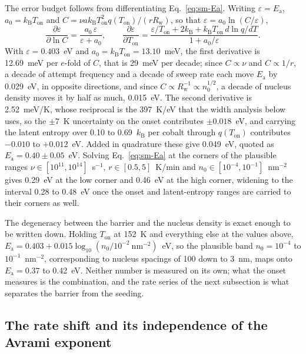 \documentclass[reprint,twocolumn,prb,amsmath,amssymb,superscriptaddress,floatfix]{revtex4-2}
\newcommand{\kB}{k_{\mathrm{B}}}
\newcommand{\Ea}{E_{\mathrm{a}}}
\newcommand{\Ton}{T_{\mathrm{on}}}
\begin{document}
The error budget follows from differentiating Eq.~\eqref{eq:sm-Ea}. Writing
$\varepsilon=\Ea$, $a_{0}=\kB\Ton$ and $C=\nu a\kB\Ton^{2}q(\Ton)/(r R_{\mathrm{w}})$, so that
$\varepsilon=a_{0}\ln(C/\varepsilon)$,
\begin{equation}
  \frac{\partial\varepsilon}{\partial\ln C}=\frac{a_{0}\,\varepsilon}{\varepsilon+a_{0}},
  \qquad
  \frac{\partial\varepsilon}{\partial\Ton}
  =\frac{\varepsilon/\Ton+2\kB+\kB\Ton\,d\ln q/dT}{1+a_{0}/\varepsilon}.
  \label{eq:sm-sensitivity}
\end{equation}
With $\varepsilon=0.403$~eV and $a_{0}=\kB\Ton=13.10$~meV, the first derivative is 12.69~meV
per $e$-fold of $C$, that is 29~meV per decade; since $C\propto\nu$ and $C\propto1/r$, a decade
of attempt frequency and a decade of sweep rate each move $\Ea$ by 0.029~eV, in opposite
directions, and since $C\propto R_{\mathrm{w}}^{-1}\propto n_{0}^{1/2}$, a decade of nucleus
density moves it by half as much, 0.015~eV. The second derivative is 2.52~meV/K, whose
reciprocal is the 397~K/eV that the width analysis below uses, so the $\pm7$~K uncertainty on
the onset contributes $\pm0.018$~eV, and carrying the latent entropy over 0.10 to 0.69~$\kB$ per cobalt
through $q(\Ton)$ contributes $-0.010$ to $+0.012$~eV. Added in quadrature these give
0.049~eV, quoted as $\Ea=0.40\pm0.05$~eV. Solving Eq.~\eqref{eq:sm-Ea} at the corners of the
plausible ranges $\nu\in[10^{11},10^{14}]$~s$^{-1}$, $r\in[0.5,5]$~K/min and
$n_{0}\in[10^{-4},10^{-1}]$~nm$^{-2}$ gives 0.29~eV at the low corner and 0.46~eV at the high
corner, widening to the interval 0.28 to 0.48~eV once the onset and latent-entropy ranges are
carried to their corners as well.

The degeneracy between the barrier and the nucleus density is exact enough to be written down.
Holding $\Ton$ at 152~K and everything else at the values above,
$\Ea=0.403+0.015\log_{10}(n_{0}/10^{-2}\ \mathrm{nm}^{-2})$~eV, so the plausible band
$n_{0}=10^{-4}$ to $10^{-1}$~nm$^{-2}$, corresponding to nucleus spacings of 100 down to 3~nm,
maps onto $\Ea=0.37$ to 0.42~eV. Neither number is measured on its own; what the onset measures
is the combination, and the rate series of the next subsection is what separates the barrier
from the seeding.

\subsection{The rate shift and its independence of the Avrami exponent}
\end{document}
